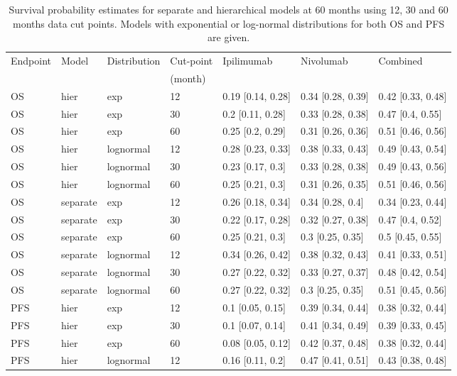 \documentclass[AMA,STIX1COL]{WileyNJD-v2}
\begin{document}
\begin{table}[!ht]
\centering
\caption{Survival probability estimates for separate and hierarchical models at 60 months using 12, 30 and 60 months data cut points. Models with exponential or log-normal distributions for both OS and PFS are given. \label{tab:cutpoint_pred}}
\begin{tabular}{l|l|l|l|l|l|l}
\hline
Endpoint & Model & Distribution & Cut-point & Ipilimumab & Nivolumab & Combined\\
 &  &  & (month) & & & \\
\hline
OS & hier & exp & 12 & 0.19 [0.14, 0.28] & 0.34 [0.28, 0.39] & 0.42 [0.33, 0.48]\\
\hline
OS & hier & exp & 30 & 0.2 [0.11, 0.28] & 0.33 [0.28, 0.38] & 0.47 [0.4, 0.55]\\
\hline
OS & hier & exp & 60 & 0.25 [0.2, 0.29] & 0.31 [0.26, 0.36] & 0.51 [0.46, 0.56]\\
\hline
OS & hier & lognormal & 12 & 0.28 [0.23, 0.33] & 0.38 [0.33, 0.43] & 0.49 [0.43, 0.54]\\
\hline
OS & hier & lognormal & 30 & 0.23 [0.17, 0.3] & 0.33 [0.28, 0.38] & 0.49 [0.43, 0.56]\\
\hline
OS & hier & lognormal & 60 & 0.25 [0.21, 0.3] & 0.31 [0.26, 0.35] & 0.51 [0.46, 0.56]\\
\hline
OS & separate & exp & 12 & 0.26 [0.18, 0.34] & 0.34 [0.28, 0.4] & 0.34 [0.23, 0.44]\\
\hline
OS & separate & exp & 30 & 0.22 [0.17, 0.28] & 0.32 [0.27, 0.38] & 0.47 [0.4, 0.52]\\
\hline
OS & separate & exp & 60 & 0.25 [0.21, 0.3] & 0.3 [0.25, 0.35] & 0.5 [0.45, 0.55]\\
\hline
OS & separate & lognormal & 12 & 0.34 [0.26, 0.42] & 0.38 [0.32, 0.43] & 0.41 [0.33, 0.51]\\
\hline
OS & separate & lognormal & 30 & 0.27 [0.22, 0.32] & 0.33 [0.27, 0.37] & 0.48 [0.42, 0.54]\\
\hline
OS & separate & lognormal & 60 & 0.27 [0.22, 0.32] & 0.3 [0.25, 0.35] & 0.51 [0.45, 0.56]\\
\hline
PFS & hier & exp & 12 & 0.1 [0.05, 0.15] & 0.39 [0.34, 0.44] & 0.38 [0.32, 0.44]\\
\hline
PFS & hier & exp & 30 & 0.1 [0.07, 0.14] & 0.41 [0.34, 0.49] & 0.39 [0.33, 0.45]\\
\hline
PFS & hier & exp & 60 & 0.08 [0.05, 0.12] & 0.42 [0.37, 0.48] & 0.38 [0.32, 0.44]\\
\hline
PFS & hier & lognormal & 12 & 0.16 [0.11, 0.2] & 0.47 [0.41, 0.51] & 0.43 [0.38, 0.48]\\

\end{tabular}
\end{table}
\end{document}
